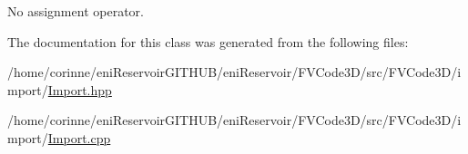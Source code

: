 No assignment operator. 



The documentation for this class was generated from the following files\+:\begin{DoxyCompactItemize}
\item 
/home/corinne/eni\+Reservoir\+G\+I\+T\+H\+U\+B/eni\+Reservoir/\+F\+V\+Code3\+D/src/\+F\+V\+Code3\+D/import/\hyperlink{Import_8hpp}{Import.\+hpp}\item 
/home/corinne/eni\+Reservoir\+G\+I\+T\+H\+U\+B/eni\+Reservoir/\+F\+V\+Code3\+D/src/\+F\+V\+Code3\+D/import/\hyperlink{Import_8cpp}{Import.\+cpp}\end{DoxyCompactItemize}
